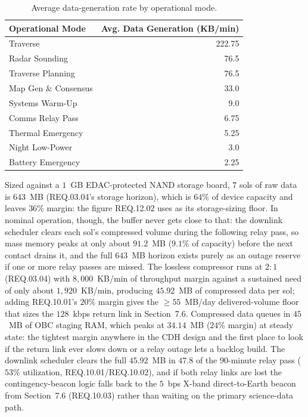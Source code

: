 \documentclass[11pt]{article}
\begin{document}
\begin{table}[H]
\centering
\small
\begin{tabular}{lr}
\toprule
\textbf{Operational Mode} & \textbf{Avg. Data Generation (KB/min)} \\
\midrule
Traverse & 222.75 \\
Radar Sounding & 76.5 \\
Traverse Planning & 76.5 \\
Map Gen \& Consensus & 33.0 \\
Systems Warm-Up & 9.0 \\
Comms Relay Pass & 6.75 \\
Thermal Emergency & 5.25 \\
Night Low-Power & 3.0 \\
Battery Emergency & 2.25 \\
\bottomrule
\end{tabular}
\caption{Average data-generation rate by operational mode.}
\label{tab:cdh-mode-rates}
\end{table}

Sized against a $1$~GB EDAC-protected NAND storage board, $7$ sols of raw data is $643$~MB
(REQ.03.04's storage horizon), which is $64\%$ of device capacity and leaves $36\%$ margin:
the figure REQ.12.02 uses as its storage-sizing floor. In nominal operation, though, the buffer
never gets close to that: the downlink scheduler clears each sol's compressed volume during the
following relay pass, so mass memory peaks at only about $91.2$~MB ($9.1\%$ of capacity) before
the next contact drains it, and the full $643$~MB horizon exists purely as an outage reserve if
one or more relay passes are missed. The lossless compressor runs at $2{:}1$ (REQ.03.04) with
$8{,}000$~KB/min of throughput margin against a sustained need of only about $1{,}920$~KB/min,
producing $45.92$~MB of compressed data per sol; adding REQ.10.01's $20\%$ margin gives the
$\geq 55$~MB/day delivered-volume floor that sizes the $128$~kbps return link in Section~7.6.
Compressed data queues in $45$~MB of OBC staging RAM, which peaks at $34.14$~MB ($24\%$ margin)
at steady state: the tightest margin anywhere in the CDH design and the first place to look if
the return link ever slows down or a relay outage lets a backlog build. The downlink scheduler
clears the full $45.92$~MB in $47.8$ of the $90$-minute relay pass ($53\%$ utilization,
REQ.10.01/REQ.10.02), and if both relay links are lost the contingency-beacon logic falls back to
the $5$~bps X-band direct-to-Earth beacon from Section~7.6 (REQ.10.03) rather than waiting on the
primary science-data path.
\end{document}
